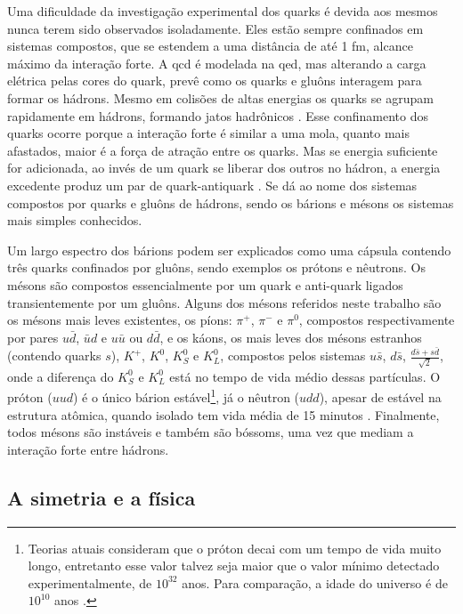 Uma dificuldade da investigação experimental dos quarks é devida aos mesmos
nunca terem sido observados isoladamente. Eles estão sempre confinados em sistemas
compostos, que se estendem a uma distância de até 1 fm, alcance máximo da interação forte. 
A \gls{qcd} é modelada na \gls{qed}, mas alterando a carga elétrica pelas cores do quark, 
prevê como os quarks e gluôns interagem para formar os hádrons. Mesmo
em colisões de altas energias os quarks se agrupam rapidamente em hádrons,
formando jatos hadrônicos \cite{Intro_Nuclear}. Esse confinamento dos quarks ocorre 
porque a interação forte é similar a uma mola, quanto mais afastados, maior é a
força de atração entre os quarks. Mas se energia suficiente for adicionada,
ao invés de um quark se liberar dos outros no hádron, a energia excedente produz
um par de quark-antiquark \cite{Beiser}.
Se dá ao nome dos sistemas compostos por quarks e gluôns de
hádrons, sendo os bárions e mésons os sistemas mais simples conhecidos. 

 
Um largo espectro dos bárions podem ser explicados como uma cápsula contendo
três quarks confinados por gluôns, sendo exemplos os prótons e nêutrons. Os mésons
são compostos essencialmente por um quark e anti-quark ligados
transientemente por um gluôns. Alguns dos mésons referidos neste trabalho são
os mésons mais leves existentes, os píons: $\pi^{+}$,
$\pi^{-}$ e $\pi^{0}$, compostos respectivamente por pares $u\bar{d}$, $\bar{u}d$ e
$u\bar{u}$ ou $d\bar{d}$, e os káons, os mais leves dos mésons estranhos
(contendo quarks $s$), $K^{+}$, $K^{0}$, $K^{0}_{S}$ e $K^{0}_{L}$, 
compostos pelos sistemas $u\bar{s}$, $d\bar{s}$,
$\frac{d\bar{s}+s\bar{d}}{\sqrt{2}}$, onde a diferença do $K^{0}_{S}$ e
$K^{0}_{L}$ está no tempo de vida médio dessas partículas. 
O próton ($uud$) é o único bárion estável\footnote{Teorias atuais consideram que
o próton decai com um tempo de vida muito longo, entretanto esse valor talvez seja maior 
que o valor mínimo detectado experimentalmente, de $10^{32}$ anos. 
Para comparação, a idade do universo é de $10^{10}$ anos \cite{Beiser}.}, 
já o nêutron ($udd$), apesar de estável na estrutura atômica,
quando isolado tem vida média de 15 minutos \cite{Intro_Standard}. Finalmente, 
todos mésons são instáveis e também são bóssoms, uma vez que mediam a interação
forte entre hádrons.

\subsection{A simetria e a física}
\label{ssec:simetria}

